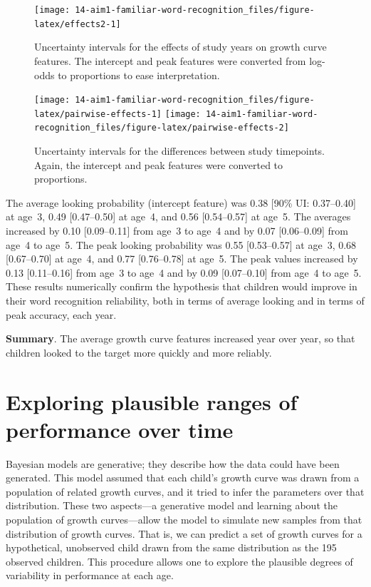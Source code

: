 \documentclass [11pt, proquest] {uwthesis}[2015/03/03]
\begin{document}
\begin{figure}
\texttt{[image: 14-aim1-familiar-word-recognition\_files/figure-latex/effects2-1]} \caption{Uncertainty intervals for the effects of study years on
growth curve features. The intercept and peak features were converted
from log-odds to proportions to ease interpretation.}\label{fig:effects2}
\end{figure}



\begin{figure}
\texttt{[image: 14-aim1-familiar-word-recognition\_files/figure-latex/pairwise-effects-1]} \texttt{[image: 14-aim1-familiar-word-recognition\_files/figure-latex/pairwise-effects-2]} \caption{Uncertainty intervals for the differences between
study timepoints. Again, the intercept and peak features were converted
to proportions.}\label{fig:pairwise-effects}
\end{figure}
The average looking probability (intercept feature) was 0.38 {[}90\% UI:
0.37--0.40{]} at age~3, 0.49 {[}0.47--0.50{]} at age~4, and 0.56
{[}0.54--0.57{]} at age~5. The averages increased by 0.10
{[}0.09--0.11{]} from age~3 to age~4 and by 0.07 {[}0.06--0.09{]} from
age~4 to age~5. The peak looking probability was 0.55 {[}0.53--0.57{]}
at age~3, 0.68 {[}0.67--0.70{]} at age~4, and 0.77 {[}0.76--0.78{]} at
age~5. The peak values increased by 0.13 {[}0.11--0.16{]} from age~3 to
age~4 and by 0.09 {[}0.07--0.10{]} from age~4 to age~5. These results
numerically confirm the hypothesis that children would improve in their
word recognition reliability, both in terms of average looking and in
terms of peak accuracy, each year.

\textbf{Summary}. The average growth curve features increased year over
year, so that children looked to the target more quickly and more
reliably.

\section{Exploring plausible ranges of performance over
time}\label{exploring-plausible-ranges-of-performance-over-time}

Bayesian models are generative; they describe how the data could have
been generated. This model assumed that each child's growth curve was
drawn from a population of related growth curves, and it tried to infer
the parameters over that distribution. These two aspects---a generative
model and learning about the population of growth curves---allow the
model to simulate new samples from that distribution of growth curves.
That is, we can predict a set of growth curves for a hypothetical,
unobserved child drawn from the same distribution as the 195 observed
children. This procedure allows one to explore the plausible degrees of
variability in performance at each age.
\end{document}
